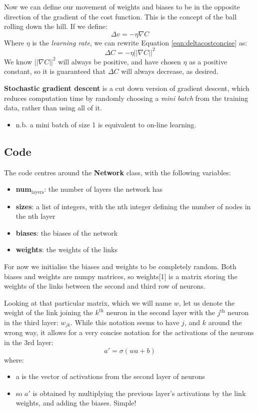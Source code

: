 \documentclass[11pt]{article}
\begin{document}
Now we can define our movement of weights and biases to be in the opposite direction of the gradient
of the cost function. This is the concept of the ball rolling down the hill. If we define:
\begin{equation}
\Delta v = - \eta \nabla C
\end{equation}
Where \(\eta\) is the \emph{learning rate}, we can rewrite Equation \ref{eqn:deltacostconcise} as:
\begin{equation}
\Delta C = - \eta ||\nabla C||^2
\end{equation}
We know \(||\nabla C||^2\) will always be positive, and have chosen \(\eta\) as a positive constant, so it 
is guaranteed that \(\Delta C\) will always decrease, as desired.

\textbf{Stochastic gradient descent} is a cut down version of gradient descent, which reduces computation time by 
randomly choosing a \emph{mini batch} from the training data, rather than using all of it.
\begin{itemize}
\item n.b. a mini batch of size 1 is equivalent to on-line learning.
\end{itemize}

\subsection{Code}
\label{sec:org1a81af0}
The code centres around the \textbf{Network} class, with the following variables:
\begin{itemize}
\item \textbf{num\(_{\text{layers}}\)}: the number of layers the network has
\item \textbf{sizes}: a list of integers, with the nth integer defining the number of nodes in the nth layer
\item \textbf{biases}: the biases of the network
\item \textbf{weights}: the weights of the links
\end{itemize}
For now we initialise the biases and weights to be completely random. Both biases and weights are numpy matrices, so weights[1] is a matrix storing the weights of the links between the second and third row of neurons. 

Looking at that particular matrix, which we will name \(w\), let us denote the weight of the link joining the \(k^{\text{th}}\) neuron in the second layer with the \(j^{\text{th}}\) neuron in the third layer: \(w_{jk}\). While this notation seems to have \(j\), and \(k\) around the wrong way, it allows for a very concise notation for the activations of the neurons in the 3rd layer:
\begin{equation} \label{eqn:activation}
a' = \sigma ( wa+b )
\end{equation}
where:
\begin{itemize}
\item a is the vector of activations from the second layer of neurons
\item so \(a'\) is obtained by multiplying the previous layer's activations by the link weights, and adding the biases. Simple!
\end{itemize}
\end{document}
